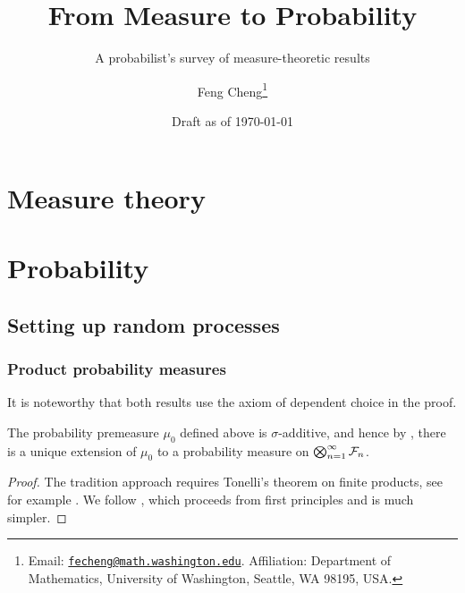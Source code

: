 \documentclass[10pt]{book}
\title{From Measure to Probability}
\subtitle{A probabilist's survey of measure-theoretic results}
\author{Feng Cheng\thanks{Email: \href{mailto:fecheng@uw.edu}{\texttt{fecheng@math.washington.edu}}. Affiliation: Department of Mathematics, University of Washington, Seattle, WA 98195, USA.}}
\date{Draft as of \today}
\begin{document}
\maketitle

\cleardoublepage
{}
\tableofcontents




\part{Measure theory}









\part{Probability}






\chapter{Setting up random processes}
\section{Product probability measures} \label{sec:product-prob-meas}
It is noteworthy that both results use the axiom of dependent choice in the proof.
\begin{namedthm} \label{thm:prod-prob-meas-countable-spaces}
    The probability premeasure $\mu_0$ defined above is $\sigma$-additive, and hence by , there is a unique extension of $\mu_0$ to a probability measure on $\bigotimes_{n=1}^\infty \mathcal{F}_n$.
\end{namedthm}
\begin{proof}
    The tradition approach requires Tonelli's theorem on finite products, see for example \cite[Section 6.3]{Ambrosio_2011}. We follow \cite{Saeki_1996}, which proceeds from first principles and is much simpler.
\end{proof}
\end{document}
